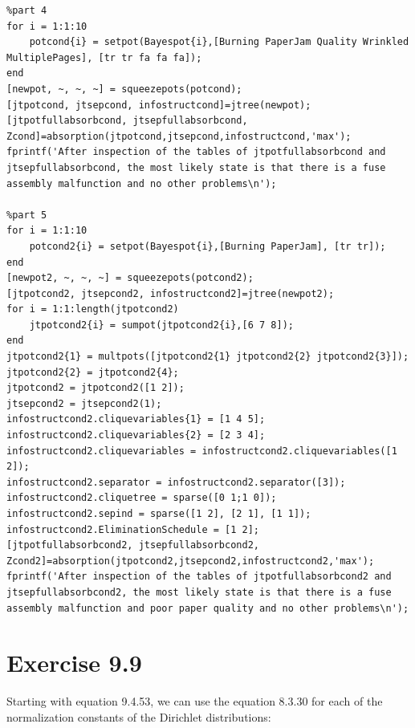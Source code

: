 \documentclass[11pt,a4paper,oneside]{report}
\begin{document}
\begin{lstlisting}
%part 4
for i = 1:1:10
    potcond{i} = setpot(Bayespot{i},[Burning PaperJam Quality Wrinkled MultiplePages], [tr tr fa fa fa]);
end
[newpot, ~, ~, ~] = squeezepots(potcond);
[jtpotcond, jtsepcond, infostructcond]=jtree(newpot);
[jtpotfullabsorbcond, jtsepfullabsorbcond, Zcond]=absorption(jtpotcond,jtsepcond,infostructcond,'max');
fprintf('After inspection of the tables of jtpotfullabsorbcond and jtsepfullabsorbcond, the most likely state is that there is a fuse assembly malfunction and no other problems\n');

%part 5
for i = 1:1:10
    potcond2{i} = setpot(Bayespot{i},[Burning PaperJam], [tr tr]);
end
[newpot2, ~, ~, ~] = squeezepots(potcond2);
[jtpotcond2, jtsepcond2, infostructcond2]=jtree(newpot2);
for i = 1:1:length(jtpotcond2)
    jtpotcond2{i} = sumpot(jtpotcond2{i},[6 7 8]);
end
jtpotcond2{1} = multpots([jtpotcond2{1} jtpotcond2{2} jtpotcond2{3}]);
jtpotcond2{2} = jtpotcond2{4};
jtpotcond2 = jtpotcond2([1 2]);
jtsepcond2 = jtsepcond2(1);
infostructcond2.cliquevariables{1} = [1 4 5];
infostructcond2.cliquevariables{2} = [2 3 4];
infostructcond2.cliquevariables = infostructcond2.cliquevariables([1 2]);
infostructcond2.separator = infostructcond2.separator([3]);
infostructcond2.cliquetree = sparse([0 1;1 0]);
infostructcond2.sepind = sparse([1 2], [2 1], [1 1]);
infostructcond2.EliminationSchedule = [1 2];
[jtpotfullabsorbcond2, jtsepfullabsorbcond2, Zcond2]=absorption(jtpotcond2,jtsepcond2,infostructcond2,'max');
fprintf('After inspection of the tables of jtpotfullabsorbcond2 and jtsepfullabsorbcond2, the most likely state is that there is a fuse assembly malfunction and poor paper quality and no other problems\n');
\end{lstlisting}

\section*{Exercise 9.9}

Starting with equation 9.4.53, we can use the equation 8.3.30 for each of the normalization constants of the Dirichlet distributions:
\end{document}
